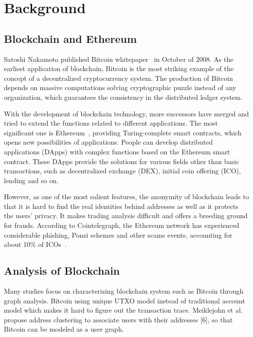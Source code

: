 
\section{Background}
\subsection{Blockchain and Ethereum}
Satoshi Nakamoto published Bitcoin whitepaper~\cite{Nakamoto2008} in October of 2008. As the earliest application of blockchain, Bitcoin is the most striking example of the concept of a decentralized cryptocurrency system. The production of Bitcoin depends on massive computations solving cryptographic puzzle instead of any organization, which guarantees the consistency in the distributed ledger system.

With the development of blockchain technology, more successors have merged and tried to extend the functions related to different applications. The most significant one is Ethereum~\cite{buterin2013ethereum}, providing Turing-complete smart contracts, which opens new possibilities of applications. People can develop distributed applications (DApps) with complex functions based on the Ethereum smart contract. These DApps provide the solutions for various fields other than basic transactions, such as decentralized exchange (DEX), initial coin offering (ICO), lending and so on.

However, as one of the most salient features, the anonymity of blockchain leads to that it is hard to find the real identities behind addresses as well as it protects the users' privacy. It makes trading analysis difficult and offers a breeding ground for frauds. According to Cointelegraph, the Ethereum network has experienced considerable phishing, Ponzi schemes and other scams events, accounting for about 10\% of ICOs~\cite{cerchiello2018icos}.

\subsection{Analysis of Blockchain}
Many studies focus on characterizing blockchain system such as Bitcoin through graph analysis. %
Bitcoin using unique UTXO model instead of traditional account model which makes it hard to figure out the transaction trace. Meiklejohn et al. propose address clustering to associate users with their addresses [6], so that Bitcoin can be modeled as a user graph.

